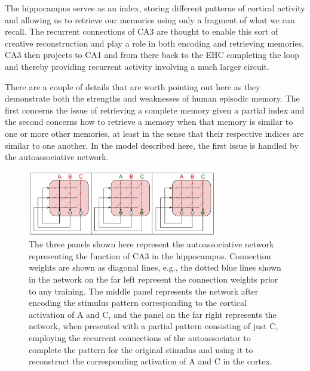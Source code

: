 \documentclass[letterpaper,11pt]{article}
\def\urlh#1{{}}
\begin{document}
The hippocampus serves as an index, storing different patterns of cortical activity and allowing us to retrieve our memories using only a fragment of what we can recall. The recurrent connections of CA3 are thought to enable this sort of creative reconstruction and play a role in both encoding and retrieving memories. CA3 then projects to CA1 and from there back to the EHC completing the loop and thereby providing recurrent activity involving a much larger circuit.


There are a couple of details that are worth pointing out here as they demonstrate both the strengths and weaknesses of human episodic memory. The first concerns the issue of retrieving a complete memory given a partial index and the second concerns how to retrieve a memory when that memory is similar to one or more other memories, at least in the sense that their respective indices are similar to one another. In the model described here, the first issue is handled by the autoassociative network.


\begin{figure}
%
  \begin{center}
    \includegraphics[width=3.25in]{./figures/Hippocampus_Auto_Associative_Network.jpg} %
  \end{center}
%
  \caption{The three panels shown here represent the autoassociative network representing the function of CA3 in the hippocampus. Connection weights are shown as diagonal lines, e.g., the dotted blue lines shown in the network on the far left represent the connection weights prior to any training. The middle panel represents the network after encoding the stimulus pattern corresponding to the cortical activation of A and C, and the panel on the far right represents the network, when presented with a partial pattern consisting of just C, employing the recurrent connections of the autoassociator to complete the pattern for the original stimulus and using it to reconstruct the corresponding activation of A and C in the cortex.}
%
  \label{fig_assoc}
%
\end{figure}
\end{document}

